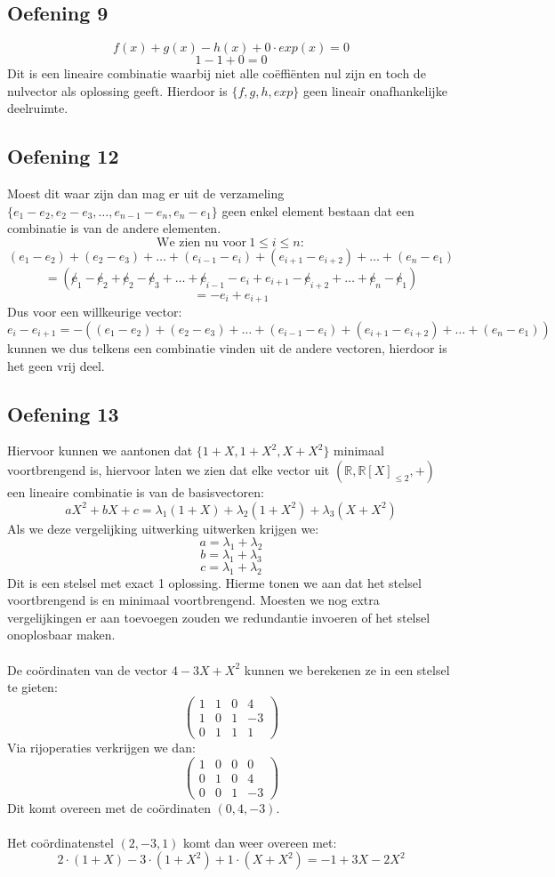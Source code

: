 \documentclass[lineaire_algebra_oplossingen.tex]{subfiles}
\begin{document}
\subsection{Oefening 9}
$$f(x)+g(x)-h(x)+0\cdot exp(x) = 0$$
$$1 - 1 + 0 = 0$$
Dit is een lineaire combinatie waarbij niet alle co\"effi\"enten nul zijn en toch de nulvector als oplossing geeft. Hierdoor is
$\{f,g,h,exp\}$ geen lineair onafhankelijke deelruimte.
\subsection{Oefening 12}
Moest dit waar zijn dan mag er uit de verzameling $\{ e_1-e_2,e_2-e_3,\dots ,e_{n-1}-e_n,e_n-e_1\}$ geen enkel element bestaan dat een combinatie is van de andere elementen.
$$
\text{We zien nu voor}\ 1 \leq i \leq n:
$$
$$ 
(e_1-e_2)+(e_2-e_3)+\dots +(e_{i-1}-e_i)+(e_{i+1}-e_{i+2})+\dots + (e_n - e_1)
$$
$$
= (\not e_1-\not e_2+\not e_2-\not e_3+\dots +\not e_{i-1}-e_i+e_{i+1}-\not e_{i+2}+\dots + \not e_n - \not e_1)
$$
$$
= -e_i + e_{i+1}
$$
Dus voor een willkeurige vector:
$$
e_i - e_{i+1} = -\left((e_1-e_2)+(e_2-e_3)+\dots +(e_{i-1}-e_i)+(e_{i+1}-e_{i+2})+\dots + (e_n - e_1)\right)
$$
kunnen we dus telkens een combinatie vinden uit de andere vectoren, hierdoor is het geen vrij deel. 
\subsection{Oefening 13}
Hiervoor kunnen we aantonen dat $\{1+X,1+X^2,X+X^2\}$ minimaal voortbrengend is, hiervoor laten we zien dat elke vector uit  $(\mathbb{R},\mathbb{R}[X]_{\leq 2},+)$ een lineaire combinatie is van de basisvectoren:
$$aX^2 + bX + c = \lambda_{1} (1+X) + \lambda_{2} (1+X^2) + \lambda_{3} (X+X^2)$$
Als we deze vergelijking uitwerking uitwerken krijgen we:
$$a = \lambda_{1} + \lambda_2$$
$$b = \lambda_1 + \lambda_3$$
$$c = \lambda_1 + \lambda_2$$
Dit is een stelsel met exact 1 oplossing. Hierme tonen we aan dat het stelsel voortbrengend is en minimaal voortbrengend. Moesten we nog extra vergelijkingen er aan toevoegen zouden we redundantie invoeren of het stelsel onoplosbaar maken.
\\
\\
De co\"ordinaten van de vector $4 -3X + X^2$ kunnen we berekenen ze in een stelsel te gieten:
$$
\begin{pmatrix}
1&1&0&4\\
1&0&1&-3\\
0&1&1&1
\end{pmatrix}
$$
Via rijoperaties verkrijgen we dan:
$$
\begin{pmatrix}
1&0&0&0\\
0&1&0&4\\
0&0&1&-3
\end{pmatrix}
$$
Dit komt overeen met de co\"ordinaten $(0,4,-3)$.
\\
\\
Het co\"ordinatenstel $(2,-3,1)$ komt dan weer overeen met:
$$
2\cdot (1+X) -3 \cdot (1+X^2)+ 1\cdot (X+X^2)= -1 +3X-2X^2
$$
\end{document}
